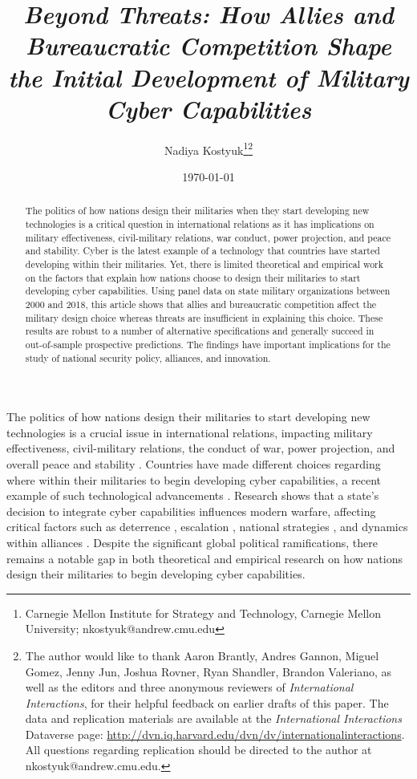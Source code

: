 \documentclass[12pt, letterpaper]{article}
\title{\large{\textit{Beyond Threats: How Allies and Bureaucratic Competition Shape the Initial Development of Military Cyber Capabilities}}	
	}
\author{Nadiya Kostyuk\thanks{
		Carnegie Mellon Institute for Strategy and Technology, Carnegie Mellon University; nkostyuk@andrew.cmu.edu
		}\thanks{
    The author would like to thank Aaron Brantly, Andres Gannon, Miguel Gomez, Jenny Jun, Joshua Rovner, Ryan Shandler, Brandon Valeriano, as well as the editors and three anonymous reviewers of \textit{International Interactions}, for their helpful feedback on earlier drafts of this paper.
    The data and replication materials are available at the \textit{International Interactions} Dataverse page: \url{http://dvn.iq.harvard.edu/dvn/dv/internationalinteractions}. All questions regarding replication should be directed to the author at nkostyuk@andrew.cmu.edu. 
} 
}
\date \today
\theoremstyle{plain}
\theoremstyle{remark}
\begin{document}
\begin{titlepage}
\maketitle

\begin{abstract}
	\footnotesize
	The politics of how nations design their militaries when they start developing new technologies is a critical question in international relations as it has implications on military effectiveness, civil-military relations, war conduct, power projection, and peace and stability. Cyber is the latest example of a technology that countries have started developing within their militaries. Yet, there is limited theoretical and empirical work on the factors that explain how nations choose to design their militaries to start developing cyber capabilities. Using panel data on state military organizations between 2000 and 2018, this article shows that allies and bureaucratic competition affect the military design choice whereas threats are insufficient in explaining this choice. These results are robust to a number of alternative specifications and generally succeed in out-of-sample prospective predictions. The findings have important implications for the study of national security policy, alliances, and innovation.  
\end{abstract}
\end{titlepage}
		
%
%
%
%
%


\newpage
\setlength{\epigraphwidth}{.8\textwidth}



\doublespacing		

\noindent
The politics of how nations design their militaries to start developing new technologies is a crucial issue in international relations, impacting military effectiveness, civil-military relations, the conduct of war, power projection, and overall peace and stability \citep{Gannon2021use, White2019}. Countries have made different choices regarding where within their militaries to begin developing cyber capabilities, a recent example of such technological advancements \citep{Blessing2020, Wiener2016penetrate}. Research shows that a state's decision to integrate cyber capabilities influences modern warfare, affecting critical factors such as deterrence \citep{borghard2017logic, lindsay2015coercion}, escalation \citep{Borghard2019SSQ, Kreps2019}, national strategies \citep{Rovner2023}, and dynamics within alliances \citep{Guenther2022JOGSS, Kostyuk2020Deterrence, Kostyuk2024JPR}. Despite the significant global political ramifications, there remains a notable gap in both theoretical and empirical research on how nations design their militaries to begin developing cyber capabilities.
\end{document}
